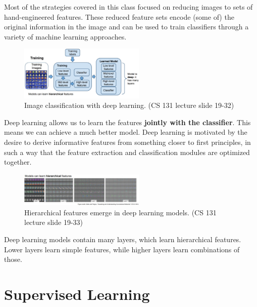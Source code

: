﻿\documentclass{article}
\begin{document}
Most of the strategies covered in this class focused on reducing images to sets of hand-engineered features. These reduced feature sets encode (some of) the original information in the image and can be used to train classifiers through a variety of machine learning approaches. 

\begin{figure}[h]
\includegraphics[width=6cm]{DL_schematic.png}
\centering
\caption{Image classification with deep learning. (CS 131 lecture slide 19-32)}
\end{figure}

Deep learning allows us to learn the features \textbf{jointly with the classifier}. This means we can achieve a much better model. Deep learning is motivated by the desire to derive informative features from something closer to first principles, in such a way that the feature extraction and classification modules are optimized together.

\begin{figure}[h]
\includegraphics[width=6cm]{Hierarchical_features.png}
\centering
\caption{Hierarchical features emerge in deep learning models. (CS 131 lecture slide 19-33)}
\end{figure}

Deep learning models contain many layers, which learn hierarchical features. Lower layers learn simple features, while higher layers learn combinations of those.
\section{Supervised Learning}
\end{document}
